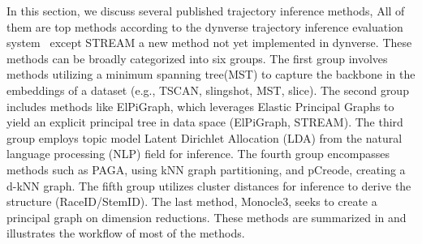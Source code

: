 In this section, we discuss several published trajectory inference methods, All of them are top methods according to the dynverse trajectory inference evaluation system~\citep{saelens2019comparison} except STREAM a new method not yet implemented in dynverse. These methods can be broadly categorized into six groups. The first group involves methods utilizing a minimum spanning tree(MST) to capture the backbone in the embeddings of a dataset (e.g., TSCAN, slingshot, MST, slice). The second group includes methods like ElPiGraph, which leverages Elastic Principal Graphs to yield an explicit principal tree in data space (ElPiGraph, STREAM). The third group employs topic model Latent Dirichlet Allocation (LDA) from the natural language processing (NLP) field for inference. The fourth group encompasses methods such as PAGA, using kNN graph partitioning, and pCreode, creating a d-kNN graph. The fifth group utilizes cluster distances for inference to derive the structure (RaceID/StemID). The last method, Monocle3, seeks to create a principal graph on dimension reductions. These methods are summarized in  and  illustrates the workflow of most of the methods.

